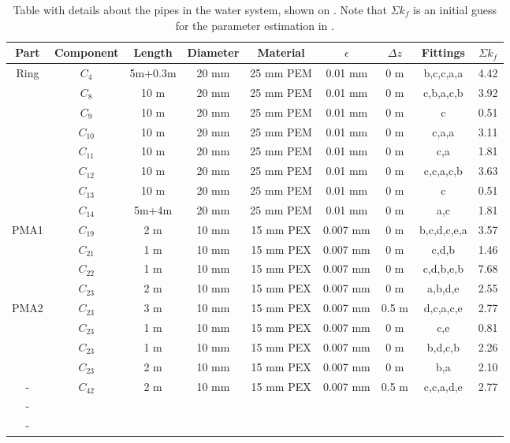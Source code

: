 \begin{table}[]
\centering
\begin{adjustbox}{max width=\textwidth}
\begin{tabular}{c|c|c|c|c|c|c|c|c}
Part & Component & Length & Diameter & Material & $\epsilon$ & $\Delta z$& Fittings   & $\Sigma k_f$  \\\hline
Ring & $C_4$ 	 & 5m+0.3m& 20 mm 	 & 25 mm PEM& 0.01 mm 	 & 0 m 		 & b,c,c,a,a  &  4.42  		  \\ %
 	 & $C_8$ 	 & 10 m	  & 20 mm 	 & 25 mm PEM& 0.01 mm 	 & 0 m 	 	 & c,b,a,c,b  &  3.92  		  \\
 	 & $C_9$ 	 & 10 m	  & 20 mm 	 & 25 mm PEM& 0.01 mm 	 & 0 m 		 & c 	      &  0.51 		  \\
	 & $C_{10}$  & 10 m	  & 20 mm 	 & 25 mm PEM& 0.01 mm 	 & 0 m 		 & c,a,a 	  &  3.11 		  \\
 	 & $C_{11}$  & 10 m	  & 20 mm 	 & 25 mm PEM& 0.01 mm 	 & 0 m 		 & c,a 		  &  1.81 		  \\
 	 & $C_{12}$  & 10 m	  & 20 mm 	 & 25 mm PEM& 0.01 mm 	 & 0 m 		 & c,c,a,c,b  &  3.63		  \\
 	 & $C_{13}$  & 10 m   & 20 mm 	 & 25 mm PEM& 0.01 mm 	 & 0 m 		 & c 		  &  0.51		  \\
 	 & $C_{14}$  & 5m+4m  & 20 mm 	 & 25 mm PEM& 0.01 mm 	 & 0 m 		 & a,c 		  &  1.81  		  \\ \hline
PMA1 & $C_{19}$	 & 2 m 	  & 10 mm    & 15 mm PEX& 0.007 mm   & 0 m 		 & b,c,d,c,e,a&  3.57 		  \\ %
	 & $C_{21}$  & 1 m 	  & 10 mm    & 15 mm PEX& 0.007 mm   & 0 m 		 & c,d,b 	  &  1.46 		  \\
 	 & $C_{22}$  & 1 m 	  & 10 mm    & 15 mm PEX& 0.007 mm   & 0 m 		 & c,d,b,e,b  &  7.68  		  \\
 	 & $C_{23}$  & 2 m 	  & 10 mm    & 15 mm PEX& 0.007 mm   & 0 m 		 & a,b,d,e    &  2.55  		  \\ \hline
PMA2 & $C_{23}$  & 3 m	  & 10 mm    & 15 mm PEX& 0.007 mm   & 0.5 m  	 & d,c,a,c,e  &  2.77	      \\
 	 & $C_{23}$  & 1 m 	  & 10 mm    & 15 mm PEX& 0.007 mm   & 0 m 		 & c,e 		  &  0.81    	  \\
 	 & $C_{23}$  & 1 m 	  & 10 mm    & 15 mm PEX& 0.007 mm   & 0 m 	   	 & b,d,c,b 	  &  2.26     	  \\
 	 & $C_{23}$  & 2 m 	  & 10 mm    & 15 mm PEX& 0.007 mm   & 0 m 		 & b,a 		  &  2.10    	  \\ \hline
- 	 & $C_{42}$  & 2 m    & 10 mm 	 & 15 mm PEX& 0.007 mm   & 0.5 m 	 & c,c,a,d,e  &  2.77 		  \\
- 	 &  &  &  &  &  &  &    \\
- 	 &  &  &  &  &  &  &   
\end{tabular}
\end{adjustbox}
\caption{Table with details about the pipes in the water system, shown on . Note that $\Sigma k_f$ is an initial guess for the parameter estimation in .}
\label{tab:pip_detail}
\end{table}

